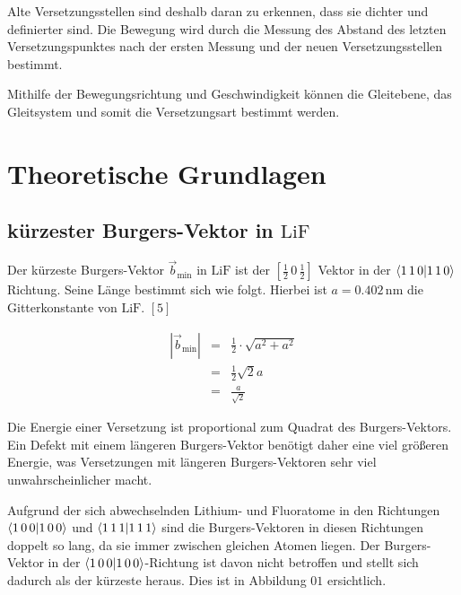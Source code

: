 \documentclass[12pt,a4paper]{scrartcl}
\numberwithin{equation}{section} %
\renewcommand{\[}{} %
\renewcommand{\]}{\noindent} %
\begin{document}
Alte Versetzungsstellen sind deshalb daran zu erkennen, dass sie dichter
und definierter sind. Die Bewegung wird durch die Messung des Abstand
des letzten Versetzungspunktes nach der ersten Messung und der neuen
Versetzungsstellen bestimmt.

Mithilfe der Bewegungsrichtung und Geschwindigkeit können die
Gleitebene, das Gleitsystem und somit die Versetzungsart bestimmt
werden.

\hypertarget{theoretische-grundlagen}{%
\section{Theoretische Grundlagen}\label{theoretische-grundlagen}}

\hypertarget{kuxfcrzester-burgers-vektor-in-mathrmlif}{%
\subsection{\texorpdfstring{kürzester Burgers-Vektor in
\(\mathrm{LiF}\)}{kürzester Burgers-Vektor in \textbackslash mathrm\{LiF\}}}\label{kuxfcrzester-burgers-vektor-in-mathrmlif}}

Der kürzeste Burgers-Vektor \(\vec{b}_\mathrm{min}\) in \(\mathrm{LiF}\)
ist der \([\frac{1}{2}\,0\,\frac{1}{2}]\) Vektor in der
\(\braket{1\,1\,0}\) Richtung. Seine Länge bestimmt sich wie folgt.
Hierbei ist \(a=0.402\,\mathrm{nm}\) die Gitterkonstante von
\(\mathrm{LiF}\). \([5]\)

\[
\begin{eqnarray}
    \left|\vec{b}_\mathrm{min}\right|
        &=& \frac{1}{2} \cdot \sqrt{a^2 + a^2} \\
        &=& \frac{1}{2} \sqrt{2} a \\
        &=& \frac{a}{\sqrt{2}}
\end{eqnarray}
\]

Die Energie einer Versetzung ist proportional zum Quadrat des
Burgers-Vektors. Ein Defekt mit einem längeren Burgers-Vektor benötigt
daher eine viel größeren Energie, was Versetzungen mit längeren
Burgers-Vektoren sehr viel unwahrscheinlicher macht.

Aufgrund der sich abwechselnden Lithium- und Fluoratome in den
Richtungen \(\braket{1\,0\,0}\) und \(\braket{1\,1\,1}\) sind die
Burgers-Vektoren in diesen Richtungen doppelt so lang, da sie immer
zwischen gleichen Atomen liegen. Der Burgers-Vektor in der
\(\braket{1\,0\,0}\)-Richtung ist davon nicht betroffen und stellt sich
dadurch als der kürzeste heraus. Dies ist in Abbildung \(01\)
ersichtlich.
\end{document}
